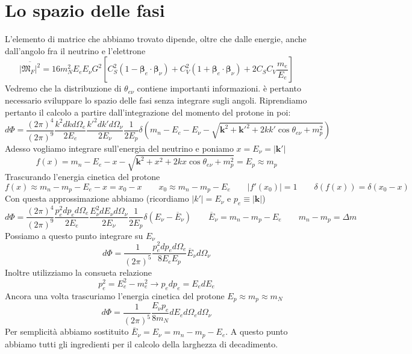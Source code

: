 \section{Lo spazio delle fasi}
L'elemento di matrice che abbiamo trovato dipende, oltre che dalle energie, anche dall'angolo fra il neutrino e l'elettrone
$$
\overline{|\mathfrak{M}_F|^2} = 16m_N^2 E_e E_\nu G^2 \left[ C_S^2 (1 - \boldsymbol{\beta}_e \cdot \boldsymbol{\beta}_\nu) + C_V^2 (1 + \boldsymbol{\beta}_e \cdot \boldsymbol{\beta}_\nu) + 2C_S C_V \frac{m_e}{E_e} \right]
$$
Vedremo che la distribuzione di $\theta_{e\nu}$ contiene importanti informazioni. è pertanto necessario sviluppare lo spazio delle fasi senza integrare sugli angoli. Riprendiamo pertanto il calcolo a partire dall'integrazione del momento del protone in poi:
$$
d\Phi = \frac{(2\pi)^4}{(2\pi)^9} \frac{k^2 dk d\Omega_e}{2E_e} \frac{k'^2 dk' d\Omega_\nu}{2E_\nu} \frac{1}{2E_p} \delta(m_n - E_e - E_\nu - \sqrt{\mathbf{k}^2 + \mathbf{k}'^2 + 2kk' \cos\theta_{e\nu} + m_p^2})
$$
Adesso vogliamo integrare sull'energia del neutrino e poniamo $x=E_\nu=|\mathbf{k}'|$
$$
f(x) = m_n - E_e - x - \sqrt{\mathbf{k}^2 + x^2 + 2kx \cos\theta_{e\nu} + m_p^2} = E_p \approx m_p
$$
Trascurando l'energia cinetica del protone
$$
f(x) \approx m_n - m_p - E_e - x = x_0 - x \qquad x_0 \approx m_n - m_p - E_e \qquad |f'(x_0)| = 1 \qquad \delta(f(x)) = \delta(x_0 - x)
$$
Con questa approssimazione abbiamo (ricordiamo $|k'|=E_\nu$ e $p_e$$\equiv|\mathbf{k}|$)
$$
d\Phi = \frac{(2\pi)^4}{(2\pi)^9} \frac{p_e^2 dp_e d\Omega_e}{2E_e} \frac{E_\nu^2 dE_\nu d\Omega_\nu}{2E_\nu} \frac{1}{2E_p} \delta(E_\nu - \overline{E}_\nu)\qquad \overline{E}_\nu = m_n - m_p - E_e \qquad m_n - m_p = \Delta m
$$ 
Possiamo a questo punto integrare su $E_\nu$
$$
d\Phi = \frac{1}{(2\pi)^5} \frac{p_e^2 dp_e d\Omega_e}{8E_e E_p} \overline{E}_\nu d\Omega_\nu
$$
Inoltre utilizziamo la consueta relazione
$$
p_e^2 = E_e^2 - m_e^2 \to p_e dp_e = E_e dE_e
$$
Ancora una volta trascuriamo l'energia cinetica del protone $E_p\approx m_p \approx m_N$
$$
d\Phi = \frac{1}{(2\pi)^5} \frac{E_\nu p_e}{8m_N} dE_e d\Omega_e d\Omega_\nu
$$
Per semplicità abbiamo sostituito $\overline{E}_\nu=E_\nu=m_n-m_p-E_e$. A questo punto abbiamo tutti gli ingredienti per il calcolo della larghezza di decadimento.
